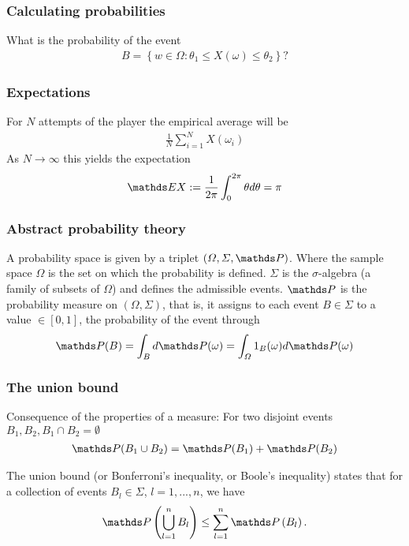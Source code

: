 \documentclass[a4paper, english, headtopline=0.08em, headsepline=0.04em, left = 1cm, right = 1cm, DIV=15]{article}
\begin{document}
\subsubsection*{Calculating probabilities}
What is the probability of the event 
\begin{align*}
	B = \left\{w\in\Omega:\theta_1\leq X(\omega)\leq \theta_2\right\}?
\end{align*}
\subsubsection*{Expectations}
For $N$ attempts of the player the empirical average will be
\begin{align*}
	\frac{1}{N}\sum_{i=1}^N X(\omega_i)
\end{align*}
As $N\rightarrow\infty$ this yields the expectation
\begin{align*}
	\EE X := \frac{1}{2\pi} \int_{0}^{2\pi}\theta d\theta = \pi
\end{align*}
\subsubsection*{Abstract probability theory}
A probability space is given by a triplet $(\Omega,\Sigma,\PP)$. Where the sample space $\Omega$
is the set on which the probability is defined. $\Sigma$ is the $\sigma$-algebra (a family of subsets of $\Omega$)
and defines the admissible events. $\PP$ is the probability measure on $(\Omega,\Sigma)$, that
is, it assigns to each event $B\in\Sigma$ to a value $\in[0,1]$, the probability of the event
through
\begin{align*}
	\PP(B) = \int_B d\PP(\omega) = \int_{\Omega} 1_B(\omega)d\PP (\omega)
\end{align*}
\subsubsection*{The union bound}
Consequence of the properties of a measure: For two disjoint events $B_1,B_2,B_1 \cap B_2 = \emptyset$
\begin{align*}
	\PP(B_1 \cup B_2) = \PP(B_1) + \PP(B_2)
\end{align*}
\begin{theorem}
The union bound (or Bonferroni's inequality, or Boole's
inequality) states that for a collection of events $B_l\in\Sigma$, $l=1,...,n$, we have
\begin{align}\label{eq3_25}
\PP\left(\bigcup_{l=1}^{n}B_{l}\right)\leq\sum_{l=1}^{n}\PP \left(B_{l}\right).
\end{align}
\end{theorem}
\end{document}

